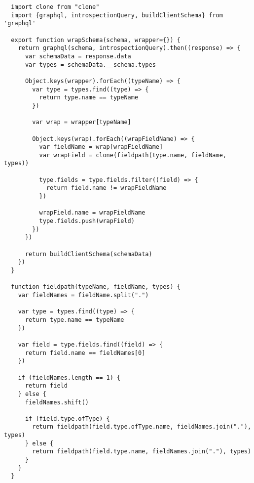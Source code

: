 \begin{verbatim}
  import clone from "clone"
  import {graphql, introspectionQuery, buildClientSchema} from 'graphql'

  export function wrapSchema(schema, wrapper={}) {
    return graphql(schema, introspectionQuery).then((response) => {
      var schemaData = response.data
      var types = schemaData.__schema.types

      Object.keys(wrapper).forEach((typeName) => {
        var type = types.find((type) => {
          return type.name == typeName
        })

        var wrap = wrapper[typeName]

        Object.keys(wrap).forEach((wrapFieldName) => {
          var fieldName = wrap[wrapFieldName]
          var wrapField = clone(fieldpath(type.name, fieldName, types))

          type.fields = type.fields.filter((field) => {
            return field.name != wrapFieldName
          })

          wrapField.name = wrapFieldName
          type.fields.push(wrapField)
        })
      })

      return buildClientSchema(schemaData)
    })
  }

  function fieldpath(typeName, fieldName, types) {
    var fieldNames = fieldName.split(".")

    var type = types.find((type) => {
      return type.name == typeName
    })

    var field = type.fields.find((field) => {
      return field.name == fieldNames[0]
    })

    if (fieldNames.length == 1) {
      return field
    } else {
      fieldNames.shift()

      if (field.type.ofType) {
        return fieldpath(field.type.ofType.name, fieldNames.join("."), types)
      } else {
        return fieldpath(field.type.name, fieldNames.join("."), types)
      }
    }
  }
\end{verbatim}
